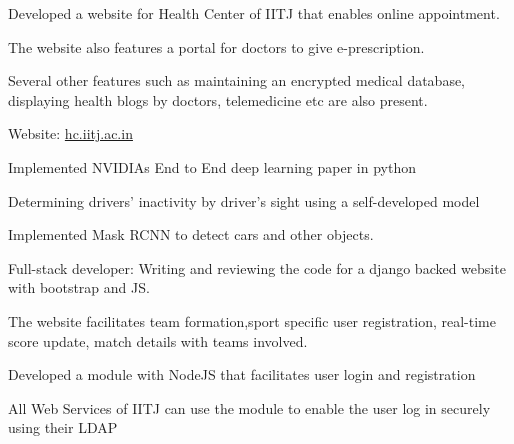 \documentclass[]{deedy-resume-openfont}
\begin{document}
\begin{minipage}[t]{0.66\textwidth}
\begin{tightemize}
\item Developed a website for Health Center of IITJ that enables online appointment.\\
\item The website also features a portal for doctors to give e-prescription.\\
\item Several other features such as maintaining an encrypted medical database, displaying health blogs by doctors, telemedicine etc are also present.\\
\item Website: \href{http://hc.iitj.ac.in/}{hc.iitj.ac.in \faExternalLink}
\end{tightemize}


\begin{tightemize}
\item Implemented NVIDIAs End to End deep learning paper in python\\
\item Determining drivers' inactivity by driver's sight using a self-developed model\\
\item Implemented Mask RCNN to detect cars and other objects.\\
\end{tightemize}



\begin{tightemize}
\item Full-stack developer: Writing and reviewing the code for a django backed website with bootstrap and JS.
\item The website facilitates team formation,sport specific user registration, real-time score update, match details with teams involved.
\end{tightemize}

\begin{tightemize}
\item Developed a module with NodeJS that facilitates user login and registration
\item All Web Services of IITJ can use the module to enable the user log in securely using their LDAP
\end{tightemize}



\end{minipage}
\end{document}

